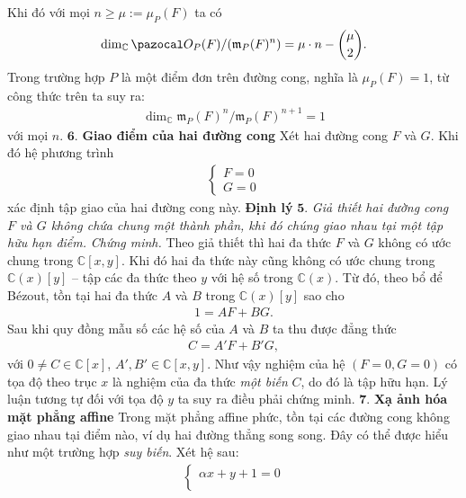 \begin{multicols}{2}
{		Khi đó với mọi $n\geq\mu:= \mu_P(F)$  ta có} 
		\begin{align*}
			\dim_{\mathbb C}  \pazocal O_P(F)/(\mathfrak m_P(F)^n)=\mu \cdot n -
			{\mu \choose 2}.
		\end{align*}
	\vskip 0.1cm
	Trong trường hợp $P$ là một điểm đơn trên đường cong, nghĩa là $\mu_P(F)=1$, từ công thức trên ta suy ra:
	\begin{align*}
		\dim_{\mathbb C} \mathfrak m_P(F)^n/\mathfrak m_P(F)^{n+1}=1
	\end{align*}
	với mọi $n$. 
	\vskip 0.1cm
	$\pmb{6.}$ \textbf{\color{duongvaotoanhoc}Giao điểm của hai đường cong}
	\vskip 0.1cm
	Xét hai đường cong $F$  và $G$. Khi đó hệ phương trình
	\begin{align*}
		\begin{cases}
			F = 0\\
			G = 0
		\end{cases}
	\end{align*}
	xác định tập giao của hai đường cong này.  
	\vskip 0.1cm
	\textbf{\color{duongvaotoanhoc}Định lý} $\pmb{5.}$ \textit{Giả thiết hai đường cong $F$  và $G$  không chứa chung một thành phần, khi đó chúng giao nhau tại một tập hữu hạn điểm.}
	\vskip 0.1cm
	\textit{Chứng minh.}
	Theo giả thiết thì hai đa thức $F$ và $G$ không có ước chung trong $\mathbb C[x,y]$. Khi đó hai đa thức này cũng không có ước chung trong $\mathbb C(x)[y]$ -- tập các đa thức theo $y$ với hệ số trong $\mathbb C(x)$. Từ đó, theo bổ để B\'ezout, tồn tại hai đa thức $A$ và $B$ trong  $\mathbb C(x)[y]$ sao cho
	\begin{align*}
		1=AF+BG.
	\end{align*}
	Sau khi quy đồng mẫu số các hệ số của $A$ và $B$ ta thu được đẳng thức
	\begin{align*}
		C= A'F+ B'G,
	\end{align*}
	với $0\neq C\in\mathbb C[x]$, $ A', B'\in \mathbb C[x,y]$. 
	Như vậy nghiệm của hệ $(F=0, G=0)$ có tọa độ theo trục $x$ là nghiệm của đa thức {\em một biến} $C$, do đó là tập hữu hạn. Lý luận tương tự đối với tọa độ $y$ ta suy ra điều phải chứng minh. 
	\vskip 0.1cm
	$\pmb{7.}$ \textbf{\color{duongvaotoanhoc}Xạ ảnh hóa mặt phẳng affine} 
	\vskip 0.1cm
	Trong mặt phẳng affine phức, tồn tại các đường cong không giao nhau tại điểm nào, ví dụ hai đường thẳng song song. 
	Đây có thể được hiểu như một trường hợp {\em suy biến}. Xét hệ sau:
	\begin{align*}
		\begin{cases}
			\alpha x+y+1 =0\\

\end{cases}
\end{align*}
\end{multicols}
